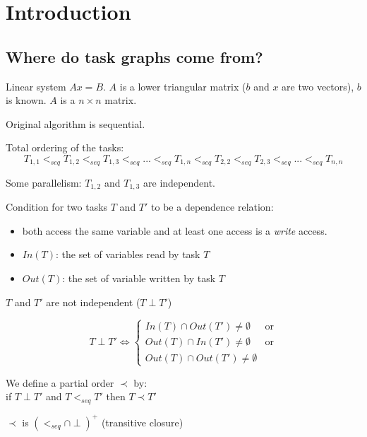 \section{Introduction}
\subsection*{Where do task graphs come from?}
Linear system $Ax=B$. $A$ is a lower triangular matrix ($b$ and $x$ are two vectors), $b$ is known. $A$ is a $n \times n$ matrix.

\begin{algorithm}[H]
\end{algorithm}


Original algorithm is sequential.


Total ordering of the tasks:
\[T_{1,1} <_{seq} T_{1,2} <_{seq} T_{1,3} <_{seq} ... <_{seq} T_{1,n} <_{seq} T_{2,2} <_{seq} T_{2,3} <_{seq} ... <_{seq} T_{n,n}\]

Some parallelism: $T_{1,2}$ and $T_{1,3}$ are independent.

Condition for two tasks $T$ and $T'$ to be a dependence relation:
\begin{itemize}
\item both access the same variable and at least one access is a \emph{write} access.
\item $In(T)$: the set of variables read by task $T$
\item $Out(T)$: the set of variable written by task $T$
\end{itemize}

$T$ and $T'$ are not independent ($T \perp T'$)

\[T \perp T' \Leftrightarrow
\begin{cases}
In(T)\cap Out(T')\neq \emptyset & \text{or}\\ 
Out(T)\cap In(T') \neq \emptyset &\text{or}\\
Out(T)\cap Out(T') \neq \emptyset
\end{cases}
\]

We define a partial order $\prec$ by:\\
if $T\perp T'$ and $T<_{seq} T'$ then $T\prec T'$
\bigskip


$\prec$ is $(<_{seq}\cap \perp)^+$ (transitive closure)
\bigskip


